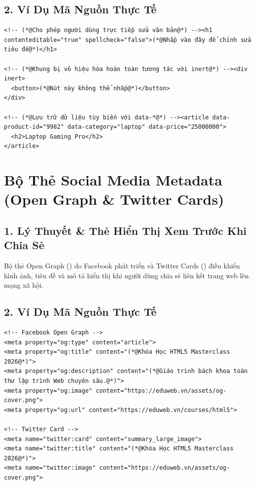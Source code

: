 \subsection{2. Ví Dụ Mã Nguồn Thực Tế}
\begin{lstlisting}[language=HTML5, caption={Ví dụ ứng dụng các thuộc tính contenteditable, inert và data-*}]
<!-- (*@Cho phép người dùng trực tiếp sửa văn bản@*) --><h1 contenteditable="true" spellcheck="false">(*@Nhấp vào đây để chỉnh sửa tiêu đề@*)</h1>

<!-- (*@Khung bị vô hiệu hóa hoàn toàn tương tác với inert@*) --><div inert>
  <button>(*@Nút này không thể nhấp@*)</button>
</div>

<!-- (*@Lưu trữ dữ liệu tùy biến với data-*@*) --><article data-product-id="9982" data-category="laptop" data-price="25000000">
  <h2>Laptop Gaming Pro</h2>
</article>
\end{lstlisting}

\section{Bộ Thẻ Social Media Metadata (Open Graph \& Twitter Cards)}
\subsection{1. Lý Thuyết \& Thẻ Hiển Thị Xem Trước Khi Chia Sẻ}
Bộ thẻ Open Graph () do Facebook phát triển và Twitter Cards () điều khiển hình ảnh, tiêu đề và mô tả hiển thị khi người dùng chia sẻ liên kết trang web lên mạng xã hội.

\subsection{2. Ví Dụ Mã Nguồn Thực Tế}
\begin{lstlisting}[language=HTML5, caption={Ví dụ bộ thẻ Open Graph chuẩn khi chia sẻ Facebook/Zalo}]
<!-- Facebook Open Graph -->
<meta property="og:type" content="article">
<meta property="og:title" content="(*@Khóa Học HTML5 Masterclass 2026@*)">
<meta property="og:description" content="(*@Giáo trình bách khoa toàn thư lập trình Web chuyên sâu.@*)">
<meta property="og:image" content="https://eduweb.vn/assets/og-cover.png">
<meta property="og:url" content="https://eduweb.vn/courses/html5">

<!-- Twitter Card -->
<meta name="twitter:card" content="summary_large_image">
<meta name="twitter:title" content="(*@Khóa Học HTML5 Masterclass 2026@*)">
<meta name="twitter:image" content="https://eduweb.vn/assets/og-cover.png">
\end{lstlisting}


